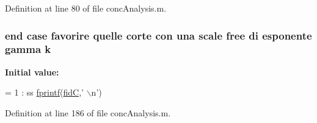 Definition at line 80 of file conc\+Analysis.\+m.

\hypertarget{a00025_ab7005e24e9bb6ea9b6e14c4ac2614a31}{
\subsubsection[{k}]{ {\bf end} case favorire quelle corte con una scale free di esponente gamma k}}\label{a00025_ab7005e24e9bb6ea9b6e14c4ac2614a31}
{\bfseries Initial value\+:}
\begin{DoxyCode}
= 1 : ss    
            \hyperlink{a00027_a21172d88d238291f06b91067ea53f814}{fprintf}(\hyperlink{a00025_a5650dbe23ad9065391c1ea56f8acd34c}{fidC},\textcolor{stringliteral}{' \(\backslash\)n'})
\end{DoxyCode}


Definition at line 186 of file conc\+Analysis.\+m.

